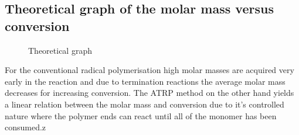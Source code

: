 \subsection{Theoretical graph of the molar mass versus conversion}

    \begin{figure}[H]
        \centering
            \caption{Theoretical graph}  
    \end{figure}

For the conventional radical polymerisation high molar masses are acquired very 
early in the reaction and due to termination reactions the average molar mass decreases 
for increasing conversion. The ATRP method on the other hand yields a linear relation between the molar mass 
and conversion due to it's controlled nature where the polymer ends can react until all of the monomer has 
been consumed.z

    